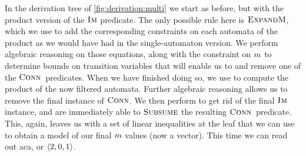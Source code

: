 In the derivation tree of \cref{fig:derivation:multi} we start as before, but
with the product version of the $\operatorname{\textsc{Im}}$ predicate. The only possible rule here
is $\textsc{ExpandM}$, which we use to add the corresponding constraints on each
automata of the product as we would have had in the single-automaton version. We
perform algebraic reasoning on those equations, along with the constraint on
$m$ to determine bounds on transition variables that will enable us
to \Subsume{} and remove one of the $\operatorname{\textsc{Conn}}{}$ predicates. When we have
finished doing so, we use \Materialise{} to compute the product of the now
filtered automata. Further algebraic reasoning allows us to remove the final
instance of $\operatorname{\textsc{Conn}}$. We then perform \Expand{} to get rid of the final
$\operatorname{\textsc{Im}}$ instance, and are immediately able to $\textsc{Subsume}$ the resulting
$\operatorname{\textsc{Conn}}{}$ predicate. This, again, leaves us with a set of linear
inequalities at the leaf that we can use to obtain a model of our final
$m$ values (now a vector). This time we can read out aca, or
$\left\langle2, 0, 1\right\rangle$.

